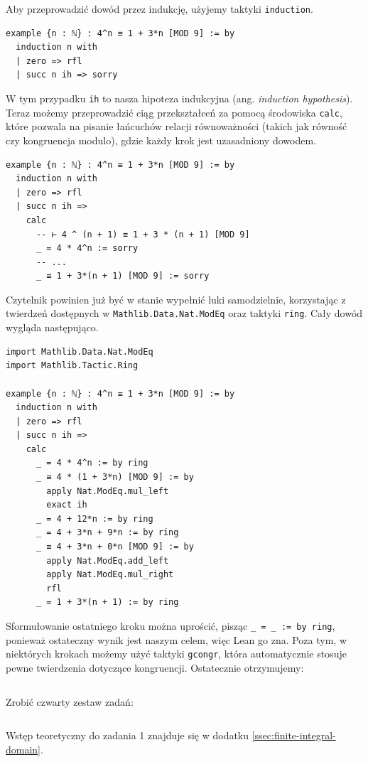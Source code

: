 \documentclass[polish,pretty,bibliography=totocnumbered]{angav}
\newcommand{\Lean}[1]{\texttt{#1}}
\begin{document}
Aby przeprowadzić dowód przez indukcję, użyjemy taktyki \Lean{induction}.
\begin{verbatim}
example {n : ℕ} : 4^n ≡ 1 + 3*n [MOD 9] := by
  induction n with
  | zero => rfl
  | succ n ih => sorry
\end{verbatim}
W tym przypadku \Lean{ih} to nasza hipoteza indukcyjna (ang. \textit{induction hypothesis}). Teraz możemy przeprowadzić ciąg przekształceń za pomocą środowiska \Lean{calc}, które pozwala na pisanie łańcuchów relacji równoważności (takich jak równość czy kongruencja modulo), gdzie każdy krok jest uzasadniony dowodem.
\begin{verbatim}
example {n : ℕ} : 4^n ≡ 1 + 3*n [MOD 9] := by
  induction n with
  | zero => rfl
  | succ n ih =>
    calc
      -- ⊢ 4 ^ (n + 1) ≡ 1 + 3 * (n + 1) [MOD 9]
      _ = 4 * 4^n := sorry
      -- ...
      _ ≡ 1 + 3*(n + 1) [MOD 9] := sorry
\end{verbatim}

Czytelnik powinien już być w stanie wypełnić luki samodzielnie, korzystając z twierdzeń dostępnych w \Lean{Mathlib.Data.Nat.ModEq} oraz taktyki \Lean{ring}. Cały dowód wygląda następująco.
\begin{verbatim}
import Mathlib.Data.Nat.ModEq
import Mathlib.Tactic.Ring

example {n : ℕ} : 4^n ≡ 1 + 3*n [MOD 9] := by
  induction n with
  | zero => rfl
  | succ n ih =>
    calc
      _ = 4 * 4^n := by ring
      _ ≡ 4 * (1 + 3*n) [MOD 9] := by
        apply Nat.ModEq.mul_left
        exact ih
      _ = 4 + 12*n := by ring
      _ = 4 + 3*n + 9*n := by ring
      _ ≡ 4 + 3*n + 0*n [MOD 9] := by
        apply Nat.ModEq.add_left
        apply Nat.ModEq.mul_right
        rfl
      _ = 1 + 3*(n + 1) := by ring
\end{verbatim}

Sformułowanie ostatniego kroku można uprościć, pisząc \Lean{_ = _ := by ring}, ponieważ ostateczny wynik jest naszym celem, więc Lean go zna. Poza tym, w niektórych krokach możemy użyć taktyki \Lean{gcongr}, która automatycznie stosuje pewne twierdzenia dotyczące kongruencji. Ostatecznie otrzymujemy:
\inputminted{lean4}{case_studies/CongruenceModulo.lean}

\begin{problem}
    Zrobić czwarty zestaw zadań:
    \inputminted{lean4}{problemsets/problemset04.lean}
\end{problem}

Wstęp teoretyczny do zadania 1 znajduje się w dodatku \ref{ssec:finite-integral-domain}.
\end{document}
